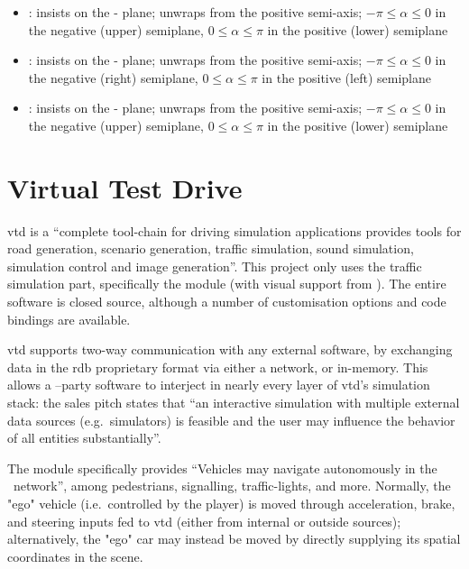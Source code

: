 \begin{itemize}
	\item {}: insists on the - plane; unwraps from the positive  semi-axis; $-\pi \leqslant \alpha \leqslant 0$ in the negative (upper) semiplane, $0 \leqslant \alpha \leqslant \pi$ in the positive (lower) semiplane
	\item {}: insists on the - plane; unwraps from the positive  semi-axis; $-\pi \leqslant \alpha \leqslant 0$ in the negative (right) semiplane, $0 \leqslant \alpha \leqslant \pi$ in the positive (left) semiplane
	\item {}: insists on the - plane; unwraps from the positive  semi-axis; $-\pi \leqslant \alpha \leqslant 0$ in the negative (upper) semiplane, $0 \leqslant \alpha \leqslant \pi$ in the positive (lower) semiplane
\end{itemize}

\section{Virtual Test Drive}\label{sc:software:vtd}

\acrfull{vtd} is a \enquote{complete tool-chain for driving simulation applications \FONTnormal{[that]} provides tools for road generation, scenario generation, traffic simulation, sound simulation, simulation control and image generation}{\cite{software:vtd}}. This project only uses the traffic simulation part, specifically the  module (with visual support from ). The entire software is closed source, although a number of customisation options and code bindings are available.

\gls{vtd} supports two-way communication with any external software, by exchanging data in the \gls{rdb} proprietary format via either a network, or in-memory. This allows a --party software to interject in nearly every layer of \gls{vtd}'s simulation stack: the sales pitch states that \enquote{an interactive simulation with multiple external data sources (e.g.\ simulators) is feasible and the user may influence the behavior of all entities substantially}{\cite{software:vtraffic}}.

The  module specifically provides \enquote{Vehicles \FONTnormal{[that]} may navigate autonomously in the \CHARomissis\ network}{\cite{software:vtraffic}}, among pedestrians, signalling, traffic-lights, and more. Normally, the "ego" vehicle (i.e.\ controlled by the player) is moved through acceleration, brake, and steering inputs fed to \gls{vtd} (either from internal or outside sources); alternatively, the "ego" car may instead be moved by directly supplying its spatial coordinates in the scene.

